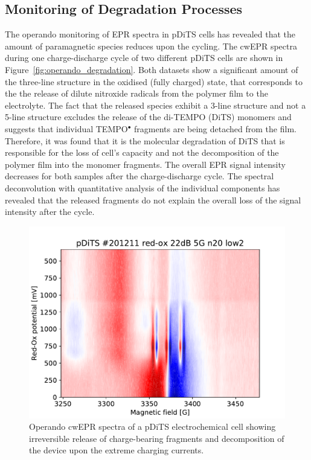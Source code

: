 \subsection{Monitoring of Degradation Processes}
The operando monitoring of EPR spectra in pDiTS cells has revealed that the amount of paramagnetic species reduces upon the cycling. The cwEPR spectra during one charge-discharge cycle of two different pDiTS cells are shown in Figure~\ref{fig:operando_degradation}. Both datasets show a significant amount of the three-line structure in the oxidised (fully charged) state, that corresponds to the the release of dilute nitroxide radicals from the polymer film to the electrolyte. The fact that the released species exhibit a 3-line structure and not a 5-line structure excludes the release of the di-TEMPO (DiTS) monomers and suggests that individual TEMPO$^{\bullet}$ fragments are being detached from the film. Therefore, it was found that it is the molecular degradation of DiTS that is responsible for the loss of cell's capacity and not the decomposition of the polymer film into the monomer fragments. The overall EPR signal intensity decreases for both samples after the charge-discharge cycle. The spectral deconvolution with quantitative analysis of the individual components has revealed that the released fragments do not explain the overall loss of the signal intensity after the cycle.


\begin{figure}[!h]
\center
	\includegraphics[width=1\textwidth]{./operando_epr/figures/degradation/overnight_dits_201211_full_redox_contour_XY.pdf}
	\caption{Operando cwEPR spectra of a pDiTS electrochemical cell showing irreversible release of charge-bearing fragments and decomposition of the device upon the extreme charging currents.}
	\label{fig:operando_degradation_device}
\end{figure}


